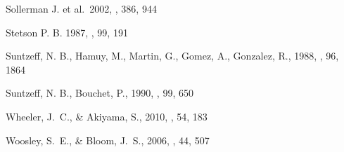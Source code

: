 


 Sollerman J. et al.\ 2002, \aap, 386, 944 

 Stetson P. B. 1987, \pasp, 99, 191


 Suntzeff, N. B., Hamuy, M., Martin, G., Gomez, A., Gonzalez, R., 1988, \aj, 96, 1864

 Suntzeff, N. B., Bouchet, P., 1990, \aj, 99, 650





 Wheeler, J.~C., \& Akiyama, S., 2010, \nar, 54, 183



 Woosley, S.~E., \& Bloom, J.~S., 2006, \araa, 44, 507
